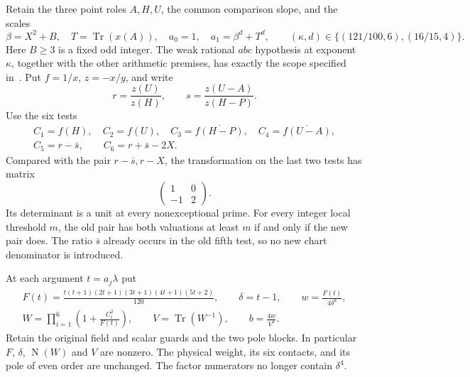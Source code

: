 \documentclass[11pt,a4paper]{article}
\DeclareMathOperator{\Tr}{Tr}\DeclareMathOperator{\Nm}{N}
\begin{document}
Retain the three point roles $A,H,U$, the common comparison slope,
and the scales
\[
 \beta=X^2+B,\quad T=\Tr(x(A)),\quad a_0=1,\quad
 a_1=\beta^d+T^d,\qquad (\kappa,d)\in
 \{(121/100,6),(16/15,4)\}.
\]
Here $B\ge3$ is a fixed odd integer. The weak rational $abc$ hypothesis
at exponent $\kappa$, together with the other arithmetic premises,
has exactly the scope specified in~\cite{Conditional,Unit}.
Put $f=1/x$, $z=-x/y$, and write
\[
 r=\frac{z(U)}{z(H)},\qquad
 s=\frac{z(U-A)}{z(H-P)}.
\]
Use the six tests
\begin{equation}\label{eq:conditionaltests}
 \begin{gathered}
 C_1=f(H),\quad C_2=f(U),\quad
 C_3=\overline{f(H-P)},\quad C_4=\overline{f(U-A)},\\
 C_5=r-\bar s,\qquad C_6=r+\bar s-2X.
 \end{gathered}
\end{equation}
Compared with the pair $r-\bar s,r-X$, the transformation on the last
two tests has matrix
\[
                         \begin{pmatrix}1&0\\-1&2\end{pmatrix}.
\]
Its determinant is a unit at every nonexceptional prime. For every
integer local threshold $m$, the old pair has both valuations at least
$m$ if and only if the new pair does. The ratio $\bar s$ already
occurs in the old fifth test, so no new chart denominator is introduced.

At each argument $t=a_j\lambda$ put
\begin{equation}\label{eq:conditionaldetector}
 \begin{gathered}
 F(t)=\frac{t(t+1)(2t+1)(3t+1)(4t+1)(5t+2)}{120},\qquad
 \delta=t-1,\qquad w=\frac{F(t)}{4\delta^8},\\
 W=\prod_{i=1}^6\left(1+\frac{C_i^2}{F(t)}\right),\qquad
 V=\Tr(W^{-1}),\qquad b=\frac{4w}{V^2}.
 \end{gathered}
\end{equation}
Retain the original field and scalar guards and the two pole blocks.
In particular $F$, $\delta$, $\Nm(W)$ and $V$ are nonzero.
The physical weight, its six contacts, and its pole of even order
are unchanged. The factor numerators no longer contain $\delta^4$.
\end{document}
